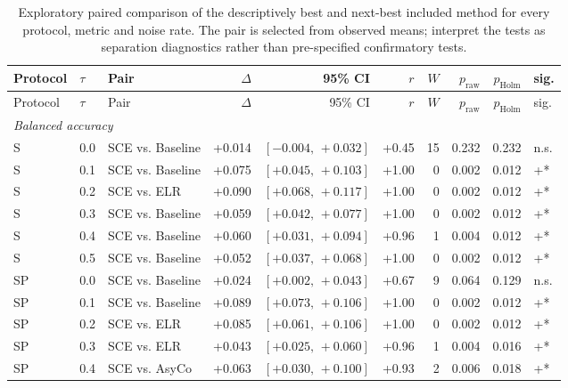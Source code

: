 
\begin{landscape}
\begin{scriptsize}
\setlength{\tabcolsep}{3pt}
\setlength{\LTcapwidth}{\linewidth}
\begin{longtable}{lllrrrrrrl}
\caption{Exploratory paired comparison of the descriptively best and next-best included method for every protocol, metric and noise rate. The pair is selected from observed means; interpret the tests as separation diagnostics rather than pre-specified confirmatory tests.}\label{tab:app-best-next-full}\\
\toprule
Protocol & $\tau$ & Pair & $\Delta$ & 95\% CI & $r$ & $W$ & $p_{\mathrm{raw}}$ & $p_{\mathrm{Holm}}$ & sig. \\
\midrule
\endfirsthead
\toprule
Protocol & $\tau$ & Pair & $\Delta$ & 95\% CI & $r$ & $W$ & $p_{\mathrm{raw}}$ & $p_{\mathrm{Holm}}$ & sig. \\
\midrule
\endhead
\multicolumn{10}{l}{\textit{Balanced accuracy}} \\
S & 0.0 & SCE vs. Baseline & +0.014 & $[-0.004,\,+0.032]$ & +0.45 & 15 & 0.232 & 0.232 & n.s. \\
S & 0.1 & SCE vs. Baseline & +0.075 & $[+0.045,\,+0.103]$ & +1.00 & 0 & 0.002 & 0.012 & +* \\
S & 0.2 & SCE vs. ELR & +0.090 & $[+0.068,\,+0.117]$ & +1.00 & 0 & 0.002 & 0.012 & +* \\
S & 0.3 & SCE vs. Baseline & +0.059 & $[+0.042,\,+0.077]$ & +1.00 & 0 & 0.002 & 0.012 & +* \\
S & 0.4 & SCE vs. Baseline & +0.060 & $[+0.031,\,+0.094]$ & +0.96 & 1 & 0.004 & 0.012 & +* \\
S & 0.5 & SCE vs. Baseline & +0.052 & $[+0.037,\,+0.068]$ & +1.00 & 0 & 0.002 & 0.012 & +* \\
SP & 0.0 & SCE vs. Baseline & +0.024 & $[+0.002,\,+0.043]$ & +0.67 & 9 & 0.064 & 0.129 & n.s. \\
SP & 0.1 & SCE vs. Baseline & +0.089 & $[+0.073,\,+0.106]$ & +1.00 & 0 & 0.002 & 0.012 & +* \\
SP & 0.2 & SCE vs. ELR & +0.085 & $[+0.061,\,+0.106]$ & +1.00 & 0 & 0.002 & 0.012 & +* \\
SP & 0.3 & SCE vs. ELR & +0.043 & $[+0.025,\,+0.060]$ & +0.96 & 1 & 0.004 & 0.016 & +* \\
SP & 0.4 & SCE vs. AsyCo & +0.063 & $[+0.030,\,+0.100]$ & +0.93 & 2 & 0.006 & 0.018 & +* \\

\end{longtable}
\end{scriptsize}
\end{landscape}
